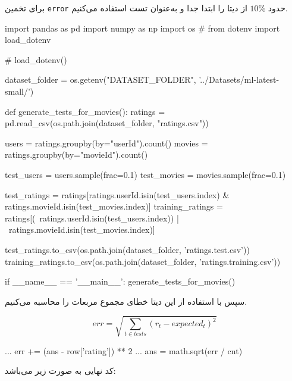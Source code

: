 برای تخمین
\verb;error;
حدود
$10\%$
از دیتا را ابتدا جدا و به‌عنوان تست استفاده می‌کنیم.

\begin{latin}
  \begin{python}
import pandas as pd
import numpy as np
import os
#  from dotenv import load_dotenv

#  load_dotenv()

dataset_folder = os.getenv("DATASET_FOLDER", '../Datasets/ml-latest-small/')


def generate_tests_for_movies():
    ratings = pd.read_csv(os.path.join(dataset_folder, "ratings.csv"))

    users = ratings.groupby(by="userId").count()
    movies = ratings.groupby(by="movieId").count()

    test_users = users.sample(frac=0.1)
    test_movies = movies.sample(frac=0.1)

    test_ratings = ratings[ratings.userId.isin(test_users.index) &
            ratings.movieId.isin(test_movies.index)]
    training_ratings = ratings[(~ratings.userId.isin(test_users.index)) |
            ~ratings.movieId.isin(test_movies.index)]


    test_ratings.to_csv(os.path.join(dataset_folder, 'ratings.test.csv'))
    training_ratings.to_csv(os.path.join(dataset_folder, 'ratings.training.csv'))

if __name__ == '__main__':
    generate_tests_for_movies()

  \end{python}
\end{latin}




سپس با استفاده از این دیتا خطای مجموع مربعات را محاسبه می‌کنیم.

\begin{latin}
  \begin{equation}
    err = \sqrt{\sum_{t \in tests}{(r_{t} - expected_{t})^{2}}}
  \end{equation}
\end{latin}

\begin{latin}
  \begin{python}

    ...
    err += (ans - row['rating']) ** 2
    ...
ans = math.sqrt(err / cnt)

  \end{python}
\end{latin}

کد نهایی به صورت زیر می‌باشد:

